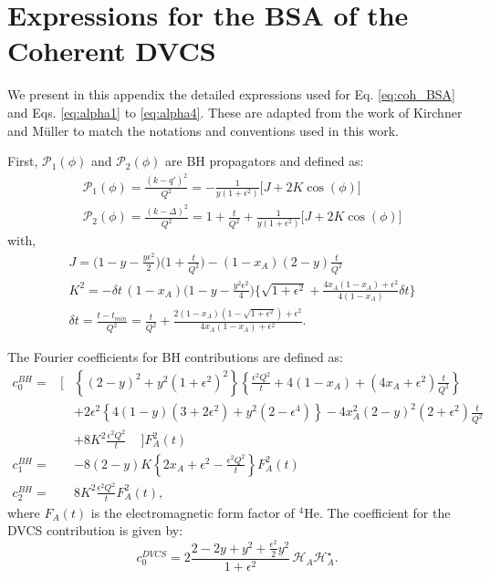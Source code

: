 \documentclass[aps,prc,preprint,superscriptaddress]{revtex4}
\begin{document}



\appendix
\section{Expressions for the BSA of the Coherent DVCS}
\label{sec:eq}

We present in this appendix the detailed expressions used for Eq. \ref{eq:coh_BSA} 
and Eqs. \ref{eq:alpha1} to \ref{eq:alpha4}. These are adapted from the work of 
Kirchner and Müller \cite{Kirchner:2003wt} to match the notations and conventions used
in this work.
	
First, $\mathcal{P}_{1}(\phi)$ and $\mathcal{P}_{2}(\phi)$ are BH propagators and defined as:
\begin{align}
&\mathcal{P}_{1}(\phi) = \frac{(k - q')^{2}}{Q^{2}} = - \frac{1}{y (1 + \epsilon^{2})} 
\big[ J + 2 K \cos(\phi) \big] \\
&\mathcal{P}_{2}(\phi) = \frac{(k - \Delta)^{2}}{Q^{2}} = 1 + \frac{t}{Q^{2}} + 
\frac{1}{y (1 + \epsilon^{2})} \big[ J + 2 K \cos(\phi) \big]
\end{align}
with,
\begin{align}
& J = \bigg( 1 - y - \frac{y \epsilon^{2}}{2} \bigg) \bigg(1 + \frac{t}{Q^{2}} \bigg) - 
(1 - x_{A})(2 - y) \frac{t}{Q^{2}} \\
& K^{2} = - \delta t \, (1 - x_{A}) \bigg( 1 - y - \frac{y^{2} \epsilon^{2}}{4} \bigg) 
\bigg\{ \sqrt{1 + \epsilon^{2}} + \frac{4 x_{A} (1-x_{A}) + \epsilon^{2}}{4 (1 - x_{A})}
\delta t \bigg\} \\
& \delta t = \frac{t - t_{min}}{Q^{2}} = \frac{t}{Q^{2}} + \frac{2(1-x_{A}) \left(1- \sqrt{1 + 
\epsilon^{2}} \right) + \epsilon^{2}}{4 x_{A} (1- x_{A}) + \epsilon^{2}}.
\end{align}

The Fourier coefficients for BH contributions are defined as:
\begin{eqnarray}
c_0^{BH} = & \bigg[ & \left\{ {(2-y)}^2 + y^2{(1+\epsilon^2)}^2 \right\} 
\left\{ \frac{\epsilon^2 Q^2}{t} + 4 (1-x_A) + (4x_A+\epsilon^2) \frac{t}{Q^2} 
\right\} \nonumber \\
& \phantom{\bigg[} & + 2 \epsilon^2 \left\{ 4(1-y)(3+2\epsilon^2) + y^2(2-\epsilon^4) 
\right\} - 4 x_A^2{(2-y)}^2 (2+\epsilon^2) \frac{t}{Q^2} \nonumber \\
& \phantom{\bigg[} & + 8 K^2 \frac{\epsilon^2 Q^2}{t} \,\,\,\,\,\,\, \bigg] F_A^2(t)  \\
c_1^{BH} = & \phantom{\bigg[} & -8 (2-y) K \left\{ 2 x_A + \epsilon^2 - 
\frac{\epsilon^2 Q^2}{t} \right\} F_A^2(t)  \\
c_2^{BH} = & \phantom{\bigg[} & 8 K^2 \frac{\epsilon^2 Q^2}{t} F_A^2(t),
\end{eqnarray} 
where $F_A(t)$ is the electromagnetic form factor of $^4$He. 
The coefficient for the DVCS contribution is given by: 
\begin{equation}
   c_0^{DVCS}= 2 \frac{2-2y+y^2 + \frac{\epsilon^2}{2}y^2}{1 + \epsilon^2} \, 
   {\mathcal H}_A {\mathcal H}^{\star}_A .
   \label{eq:c0DVCS}
\end{equation}
\end{document}
